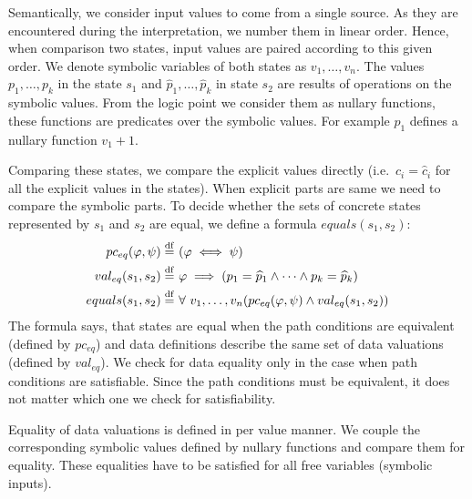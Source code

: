 Semantically, we consider input values to come from a single source. As they are
encountered during the interpretation, we number them in linear order. Hence,
when comparison two states, input values are paired according to this
given order. We denote symbolic variables of both states as $v_1, \dots, v_n$.
The values $p_1, \dots, p_k$ in the state $s_1$ and $\widehat{p}_1, \dots,
\widehat{p}_k$ in state $s_2$ are results of operations on the symbolic values.
From the logic point we consider them as nullary functions, these functions are
predicates over the symbolic values. For example $p_1$ defines a nullary
function $v_1 + 1$.

Comparing these states, we compare the explicit values directly (i.e.~$c_i =
\widehat{c}_i$ for all the explicit values in the states).  When explicit parts
are same we need to compare the symbolic parts. To decide whether the sets of
concrete states represented by $s_1$ and $s_2$ are equal, we define a formula
$equals(s_1, s_2)$:
\begin{equation*}
\begin{aligned}
    pc_{eq}(\varphi, \psi) \stackrel{\mathrm{df}}{=} & ~(\varphi \iff \psi) \\
    val_{eq}(s_1, s_2) \stackrel{\mathrm{df}}{=} & ~\varphi \implies (p_1 = \widehat{p}_1 \wedge \dots \wedge p_k = \widehat{p}_k ) \\
    equals(s_1, s_2) \stackrel{\mathrm{df}}{=} & ~\forall~v_1,\dots, v_n (pc_{eq}(\varphi, \psi)
    \wedge val_{eq}(s_1, s_2))
\end{aligned}
\end{equation*}
The formula says, that states are equal when the path conditions are
equivalent (defined by $pc_{eq}$) and data definitions describe the same set
of data valuations (defined by $val_{eq}$). We check for data equality only in
the case when path conditions are satisfiable. Since the path conditions must
be equivalent, it does not matter which one we check for satisfiability.

Equality of data valuations is defined in per value manner. We couple the
corresponding symbolic values defined by nullary functions and compare them for
equality. These equalities have to be satisfied for all free variables (symbolic
inputs).

